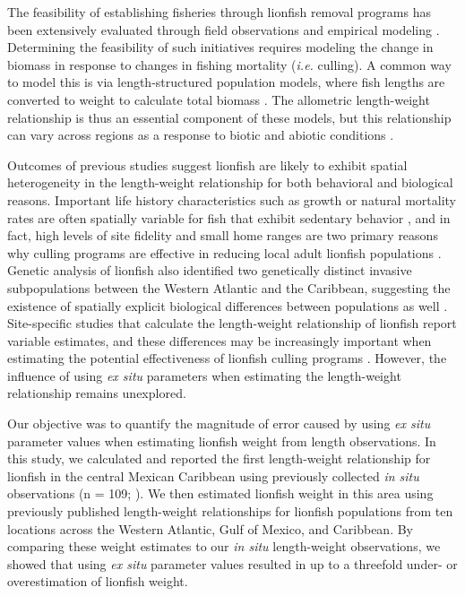 \documentclass[fleqn,10pt,lineno]{wlpeerj} %
\begin{document}
The feasibility of establishing fisheries through lionfish removal
programs has been extensively evaluated through field observations and
empirical modeling
\citep{barbour_2011,morris_2011,deleon_2013,johnston_2015,sandel_2015,usseglio_2017}.
Determining the feasibility of such initiatives requires modeling the
change in biomass in response to changes in fishing mortality
(\emph{i.e.} culling). A common way to model this is via
length-structured population models, where fish lengths are converted to
weight to calculate total biomass
\citep{barbour_2011,cote_2014,andradibrown_2017}. The allometric
length-weight relationship is thus an essential component of these
models, but this relationship can vary across regions as a response to
biotic and abiotic conditions \citep{johnson_2016}.

Outcomes of previous studies suggest lionfish are likely to exhibit
spatial heterogeneity in the length-weight relationship for both
behavioral and biological reasons. Important life history
characteristics such as growth or natural mortality rates are often
spatially variable for fish that exhibit sedentary behavior
\citep{gunderson_2008,hutchinson_2008,wilson_2012,guan_2013}, and in
fact, high levels of site fidelity and small home ranges are two primary
reasons why culling programs are effective in reducing local adult
lionfish populations
\citep{Fishelson_1997,kochzius_2005,jud_2012,cote_2014}. Genetic
analysis of lionfish also identified two genetically distinct invasive
subpopulations between the Western Atlantic and the Caribbean,
suggesting the existence of spatially explicit biological differences
between populations as well \citep{betancurr_2011}. Site-specific
studies that calculate the length-weight relationship of lionfish report
variable estimates, and these differences may be increasingly important
when estimating the potential effectiveness of lionfish culling programs
\citep{barbour_2011,morris_2011,cote_2014,johnston_2015}. However, the
influence of using \emph{ex situ} parameters when estimating the
length-weight relationship remains unexplored.

Our objective was to quantify the magnitude of error caused by using
\emph{ex situ} parameter values when estimating lionfish weight from
length observations. In this study, we calculated and reported the first
length-weight relationship for lionfish in the central Mexican Caribbean
using previously collected \emph{in situ} observations (n = 109;
\citep{villaseorderbez_2014}). We then estimated lionfish weight in this
area using previously published length-weight relationships for lionfish
populations from ten locations across the Western Atlantic, Gulf of
Mexico, and Caribbean. By comparing these weight estimates to our
\emph{in situ} length-weight observations, we showed that using \emph{ex
situ} parameter values resulted in up to a threefold under- or
overestimation of lionfish weight.
\end{document}
